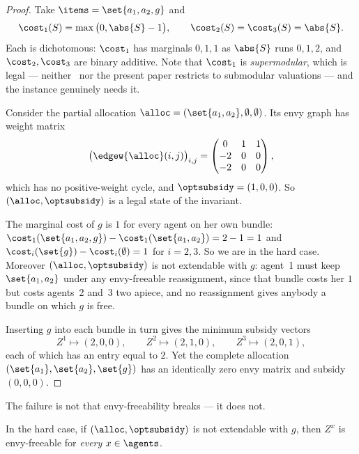 \begin{proof}
Take $\items = \set{a_1, a_2, g}$ and
\[
  \cost_1(S) = \max\big(0, \abs{S} - 1\big), \qquad
  \cost_2(S) = \cost_3(S) = \abs{S} .
\]
Each is dichotomous: $\cost_1$ has marginals $0,1,1$ as $\abs{S}$ runs
$0,1,2$, and $\cost_2, \cost_3$ are binary additive. Note that $\cost_1$ is
\emph{supermodular}, which is legal --- neither~\cite{BKNS22} nor the present
paper restricts to submodular valuations --- and the instance genuinely needs
it.

Consider the partial allocation $\alloc = (\set{a_1,a_2}, \emptyset, \emptyset)$.
Its envy graph has weight matrix
\[
  \big(\edgew{\alloc}(i,j)\big)_{i,j} =
  \begin{pmatrix} 0 & 1 & 1 \\ -2 & 0 & 0 \\ -2 & 0 & 0 \end{pmatrix},
\]
which has no positive-weight cycle, and $\optsubsidy = (1,0,0)$. So
$(\alloc, \optsubsidy)$ is a legal state of the invariant.

The marginal cost of $g$ is $1$ for every agent on her own bundle:
$\cost_1(\set{a_1,a_2,g}) - \cost_1(\set{a_1,a_2}) = 2 - 1 = 1$ and
$\cost_i(\set{g}) - \cost_i(\emptyset) = 1$ for $i = 2,3$. So we are in the hard
case. Moreover $(\alloc,\optsubsidy)$ is not extendable with $g$: agent~1 must
keep $\set{a_1,a_2}$ under any envy-freeable reassignment, since that bundle
costs her $1$ but costs agents~2 and~3 two apiece, and no reassignment gives
anybody a bundle on which $g$ is free.

Inserting $g$ into each bundle in turn gives the minimum subsidy vectors
\[
  Z^1 \mapsto (2,0,0), \qquad Z^2 \mapsto (2,1,0), \qquad Z^3 \mapsto (2,0,1),
\]
each of which has an entry equal to $2$. Yet the complete allocation
$(\set{a_1}, \set{a_2}, \set{g})$ has an identically zero envy matrix and
subsidy $(0,0,0)$.
\end{proof}

The failure is not that envy-freeability breaks --- it does not.

\begin{lemma}
\label{lem:e1}
In the hard case, if $(\alloc, \optsubsidy)$ is not extendable with $g$, then
$Z^x$ is envy-freeable for \emph{every} $x \in \agents$.
\end{lemma}

